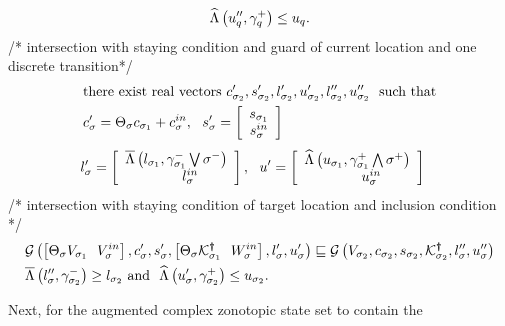 \begin{lemma}
\begin{align}
\begin{split}
\widehat{\Lambda}\left(u^{\prime\prime}_q,\gamma^+_q\right)\leq u_q.
\end{split}
 \end{align}
/* intersection with staying condition and guard of current location
and one discrete transition*/
\vspace{-0.9em}
\begin{align}
\begin{split}
& \text{there exist real
    vectors}~c^\prime_{\sigma_{2}},s^\prime_{\sigma_{2}},l^\prime_{\sigma_{2}},u^\prime_{\sigma_{2}},l^{\prime\prime}_{\sigma_{2}},u^{\prime\prime}_{\sigma_{2}}~~\text{such
  that}\\
& c^\prime_\sigma = \Theta_\sigma c_{\sigma_{1}}+c^{in}_\sigma,~~s^\prime_\sigma =
  \left[\begin{array}{c}{s_{\sigma_{1}}}\\{s^{in}_\sigma} \end{array}\right]
\end{split}
\end{align}
\vspace{-1.5em}
\begin{align}
& l^\prime_\sigma =
  \left[\begin{array}{c}{\overline{\Lambda}\left(l_{\sigma_{1}},\gamma^-_{\sigma_{1}}\bigvee\sigma^-\right)}\\{~~~~~~~~~l^{in}_{\sigma}~~~} \end{array}\right],~~u^\prime =
  \left[\begin{array}{c}{\widehat{\Lambda}\left(u_{\sigma_{1}},\gamma^+_{\sigma_{1}}\bigwedge\sigma^+\right)}\\{~~~~~~~~~u^{in}_\sigma~~~} \end{array}\right]
\end{align}
/*  intersection with staying condition of target location and inclusion condition */
\begin{align}
& \mathcal{G}\left(\left[\Theta_\sigma V_{\sigma_{1}}~~V^{in}_{\sigma}\right],c^\prime_\sigma,s^\prime_\sigma,\left[\Theta_\sigma\mathcal{K}^{\bm{\dagger}}_{\sigma_{1}}~~W^{in}_\sigma\right],l^\prime_\sigma,u^\prime_\sigma\right)
 \sqsubseteq
   \mathcal{G}\left(V_{\sigma_{2}},c_{\sigma_{2}},s_{\sigma_{2}},\mathcal{K}^{\bm{\dagger}}_{\sigma_{2}},l^{\prime\prime}_\sigma,u^{\prime\prime}_\sigma\right) \nonumber \\
& \overline{\Lambda}\left(l^{\prime\prime}_\sigma,\gamma^-_{\sigma_{2}}\right)\geq l_{\sigma_{2}}~\text{and}~~
\widehat{\Lambda}\left(u^\prime_\sigma,\gamma^+_{\sigma_{2}}\right)\leq u_{\sigma_{2}}.
\end{align}
\vspace{-1.5em}
\end{lemma}
%
Next, for the augmented complex zonotopic state set to contain the
